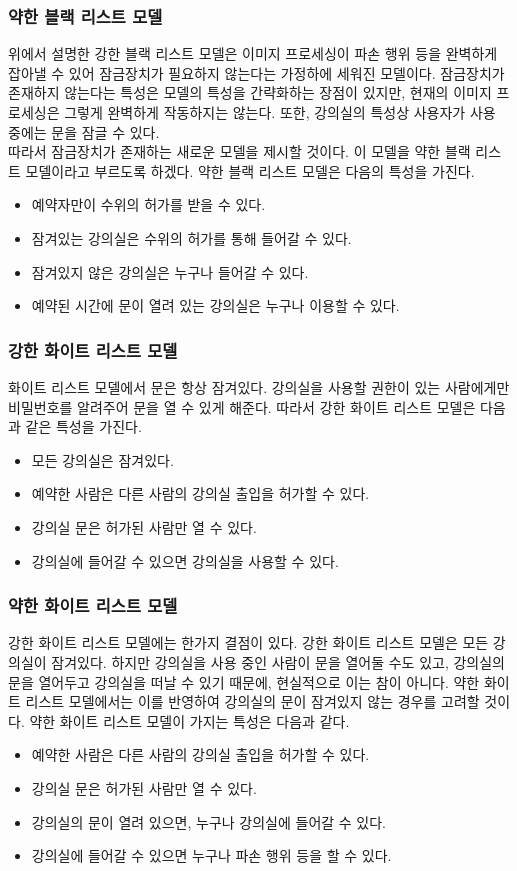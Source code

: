 \documentclass[11pt,a4paper]{article}
\begin{document}
\subsubsection{약한 블랙 리스트 모델}
위에서 설명한 강한 블랙 리스트 모델은 이미지 프로세싱이 파손 행위 등을 완벽하게 잡아낼 수 있어 잠금장치가 필요하지 않는다는 가정하에 세워진 모델이다. 잠금장치가 존재하지 않는다는 특성은 모델의 특성을 간략화하는 장점이 있지만, 현재의 이미지 프로세싱은 그렇게 완벽하게 작동하지는 않는다. 또한, 강의실의 특성상 사용자가 사용 중에는 문을 잠글 수 있다.\\
따라서 잠금장치가 존재하는 새로운 모델을 제시할 것이다. 이 모델을 약한 블랙 리스트 모델이라고 부르도록 하겠다. 약한 블랙 리스트 모델은 다음의 특성을 가진다.
\begin{itemize}
\item 예약자만이 수위의 허가를 받을 수 있다.
\item 잠겨있는 강의실은 수위의 허가를 통해 들어갈 수 있다.
\item 잠겨있지 않은 강의실은 누구나 들어갈 수 있다.
\item 예약된 시간에 문이 열려 있는 강의실은 누구나 이용할 수 있다.
\end{itemize}

\subsubsection{강한 화이트 리스트 모델}
화이트 리스트 모델에서 문은 항상 잠겨있다. 강의실을 사용할 권한이 있는 사람에게만 비밀번호를 알려주어 문을 열 수 있게 해준다. 따라서 강한 화이트 리스트 모델은 다음과 같은 특성을 가진다.
\begin{itemize}
\item 모든 강의실은 잠겨있다.
\item 예약한 사람은 다른 사람의 강의실 출입을 허가할 수 있다.
\item 강의실 문은 허가된 사람만 열 수 있다.
\item 강의실에 들어갈 수 있으면 강의실을 사용할 수 있다.
\end{itemize}

\subsubsection{약한 화이트 리스트 모델}
강한 화이트 리스트 모델에는 한가지 결점이 있다. 강한 화이트 리스트 모델은 모든 강의실이 잠겨있다. 하지만 강의실을 사용 중인 사람이 문을 열어둘 수도 있고, 강의실의 문을 열어두고 강의실을 떠날 수 있기 때문에, 현실적으로 이는 참이 아니다. 약한 화이트 리스트 모델에서는 이를 반영하여 강의실의 문이 잠겨있지 않는 경우를 고려할 것이다. 약한 화이트 리스트 모델이 가지는 특성은 다음과 같다.
\begin{itemize}
\item 예약한 사람은 다른 사람의 강의실 출입을 허가할 수 있다.
\item 강의실 문은 허가된 사람만 열 수 있다.
\item 강의실의 문이 열려 있으면, 누구나 강의실에 들어갈 수 있다.
\item 강의실에 들어갈 수 있으면 누구나 파손 행위 등을 할 수 있다.
\end{itemize}
\end{document}
